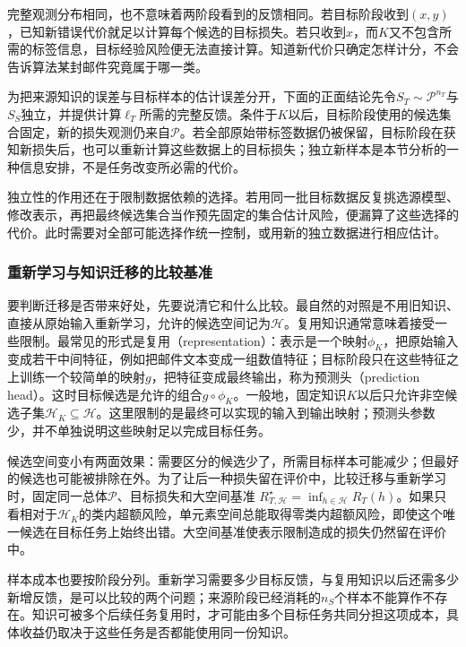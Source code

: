 完整观测分布相同，也不意味着两阶段看到的反馈相同。若目标阶段收到$(x,y)$，已知新错误代价就足以计算每个候选的目标损失。若只收到$x$，而$K$又不包含所需的标签信息，目标经验风险便无法直接计算。知道新代价只确定怎样计分，不会告诉算法某封邮件究竟属于哪一类。

为把来源知识的误差与目标样本的估计误差分开，下面的正面结论先令$S_T\sim\mathcal P^{n_T}$与$S_S$独立，并提供计算$\ell_T$所需的完整反馈。条件于$K$以后，目标阶段使用的候选集合固定，新的损失观测仍来自$\mathcal P$。若全部原始带标签数据仍被保留，目标阶段在获知新损失后，也可以重新计算这些数据上的目标损失；独立新样本是本节分析的一种信息安排，不是任务改变所必需的代价。

独立性的作用还在于限制数据依赖的选择。若用同一批目标数据反复挑选源模型、修改表示，再把最终候选集合当作预先固定的集合估计风险，便漏算了这些选择的代价。此时需要对全部可能选择作统一控制，或用新的独立数据进行相应估计。

\subsubsection{重新学习与知识迁移的比较基准}

要判断迁移是否带来好处，先要说清它和什么比较。最自然的对照是不用旧知识、直接从原始输入重新学习，允许的候选空间记为$\mathcal H$。复用知识通常意味着接受一些限制。最常见的形式是复用（representation）：表示是一个映射$\phi_K$，把原始输入变成若干中间特征，例如把邮件文本变成一组数值特征；目标阶段只在这些特征之上训练一个较简单的映射$g$，把特征变成最终输出，称为预测头（prediction head）。这时目标候选是允许的组合$g\circ\phi_K$。一般地，固定知识$K$以后只允许非空候选子集$\mathcal H_K\subseteq\mathcal H$。这里限制的是最终可以实现的输入到输出映射；预测头参数少，并不单独说明这些映射足以完成目标任务。

候选空间变小有两面效果：需要区分的候选少了，所需目标样本可能减少；但最好的候选也可能被排除在外。为了让后一种损失留在评价中，比较迁移与重新学习时，固定同一总体$\mathcal P$、目标损失和大空间基准
$R_{T,\mathcal H}^{\star}=\inf_{h\in\mathcal H}R_T(h)$。如果只看相对于$\mathcal H_K$的类内超额风险，单元素空间总能取得零类内超额风险，即使这个唯一候选在目标任务上始终出错。大空间基准使表示限制造成的损失仍然留在评价中。

样本成本也要按阶段分列。重新学习需要多少目标反馈，与复用知识以后还需多少新增反馈，是可以比较的两个问题；来源阶段已经消耗的$n_S$个样本不能算作不存在。知识可被多个后续任务复用时，才可能由多个目标任务共同分担这项成本，具体收益仍取决于这些任务是否都能使用同一份知识。

